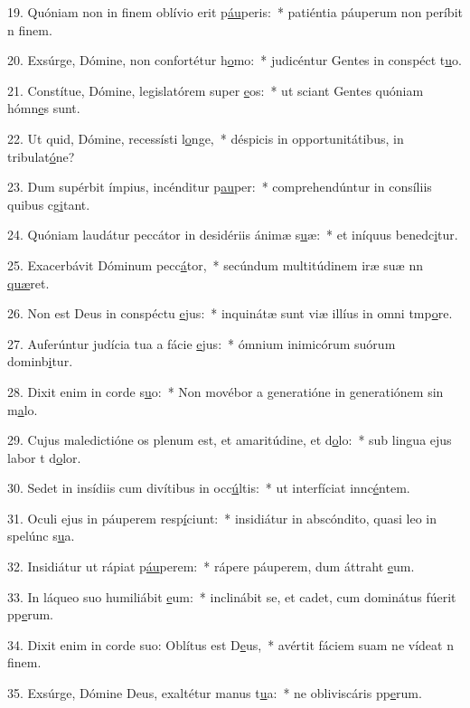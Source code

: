 19. Quóniam non in finem oblívio erit p\uline{áu}peris:~* patiéntia páuperum non períbit n f\uline{i}nem.\par 
20. Exsúrge, Dómine, non confortétur h\uline{o}mo:~* judicéntur Gentes in conspéct t\uline{u}o.\par 
21. Constítue, Dómine, legislatórem super \uline{e}os:~* ut sciant Gentes quóniam hómn\uline{e}s sunt.\par 
22. Ut quid, Dómine, recessísti l\uline{o}nge,~* déspicis in opportunitátibus, in tribulat\uline{ó}ne?\par 
23. Dum supérbit ímpius, incénditur p\uline{au}per:~* comprehendúntur in consíliis quibus cg\uline{i}tant.\par 
24. Quóniam laudátur peccátor in desidériis ánimæ s\uline{u}æ:~* et iníquus benedc\uline{i}tur.\par 
25. Exacerbávit Dóminum pecc\uline{á}tor,~* secúndum multitúdinem iræ suæ nn \uline{quæ}ret.\par 
26. Non est Deus in conspéctu \uline{e}jus:~* inquinátæ sunt viæ illíus in omni tmp\uline{o}re.\par 
27. Auferúntur judícia tua a fácie \uline{e}jus:~* ómnium inimicórum suórum dominb\uline{i}tur.\par 
28. Dixit enim in corde s\uline{u}o:~* Non movébor a generatióne in generatiónem sin m\uline{a}lo.\par 
29. Cujus maledictióne os plenum est, et amaritúdine, et d\uline{o}lo:~* sub lingua ejus labor t d\uline{o}lor.\par 
30. Sedet in insídiis cum divítibus in occ\uline{ú}ltis:~* ut interfíciat innc\uline{é}ntem.\par 
31. Oculi ejus in páuperem resp\uline{í}ciunt:~* insidiátur in abscóndito, quasi leo in spelúnc s\uline{u}a.\par 
32. Insidiátur ut rápiat p\uline{áu}perem:~* rápere páuperem, dum áttraht \uline{e}um.\par 
33. In láqueo suo humiliábit \uline{e}um:~* inclinábit se, et cadet, cum dominátus fúerit pp\uline{e}rum.\par 
34. Dixit enim in corde suo: Oblítus est D\uline{e}us,~* avértit fáciem suam ne vídeat n f\uline{i}nem.\par 
35. Exsúrge, Dómine Deus, exaltétur manus t\uline{u}a:~* ne obliviscáris pp\uline{e}rum.\par 

